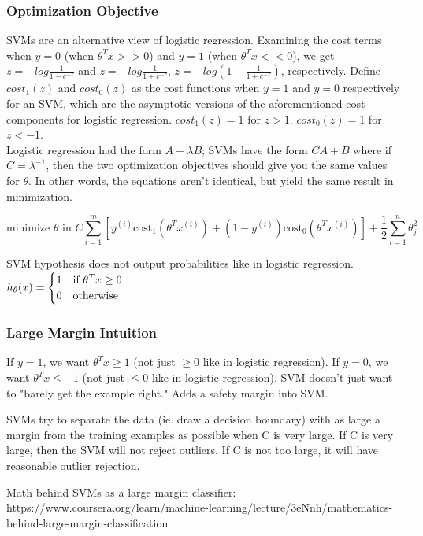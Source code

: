\documentclass[11pt,letterpaper]{article}
\begin{document}
\subsubsection{Optimization Objective}
SVMs are an alternative view of logistic regression. Examining the cost terms when $y=0$ (when $\theta^Tx >> 0$) and $y=1$ (when $\theta^Tx << 0$), we get $z = -log \frac{1}{1+e^{-z}}$ and $z = -log \frac{1}{1+e^{-z}}$, $z = -log (1-\frac{1}{1+e^{-z}})$, respectively. Define $cost_1(z)$ and $cost_0(z)$ as the cost functions when $y=1$ and $y=0$ respectively for an SVM, which are the asymptotic versions of the aforementioned cost components for logistic regression. $cost_1(z) = 1$ for $z > 1$.  $cost_0(z) = 1$ for $z < -1$.\\
Logistic regression had the form $A + \lambda B$; SVMs have the form $CA + B$ where if $C = \lambda^{-1}$, then the two optimization objectives should give you the same values for $\theta$. In other words, the equations aren't identical, but yield the same result in minimization.

$$ \textrm{minimize } \theta \textrm{ in } C \sum_{i=1}^{m}[y^{(i)}\textrm{cost}_1(\theta^Tx^{(i)}) + (1-y^{(i)})\textrm{cost}_0(\theta^Tx^{(i)})] + \frac{1}{2}\sum_{i=1}^{n}\theta_j^2$$

SVM hypothesis does not output probabilities like in logistic regression.
\( h_\theta(x) = 
\begin{cases}
      1 & \textrm{if } \theta^Tx \geq 0 \\
      0 & \textrm{otherwise}
\end{cases} \\
\)

\subsubsection{Large Margin Intuition}
If $y = 1$, we want $\theta^Tx \geq 1$ (not just $\geq 0$ like in logistic regression).
If $y = 0$, we want $\theta^Tx \leq -1$ (not just $\le 0$ like in logistic regression).
SVM doesn't just want to "barely get the example right." Adds a safety margin into SVM.

SVMs try to separate the data (ie. draw a decision boundary) with as large a margin from the training examples as possible when C is very large. If C is very large, then the SVM will not reject outliers. If C is not too large, it will have reasonable outlier rejection.

Math behind SVMs as a large margin classifier: https://www.coursera.org/learn/machine-learning/lecture/3eNnh/mathematics-behind-large-margin-classification
\end{document}
